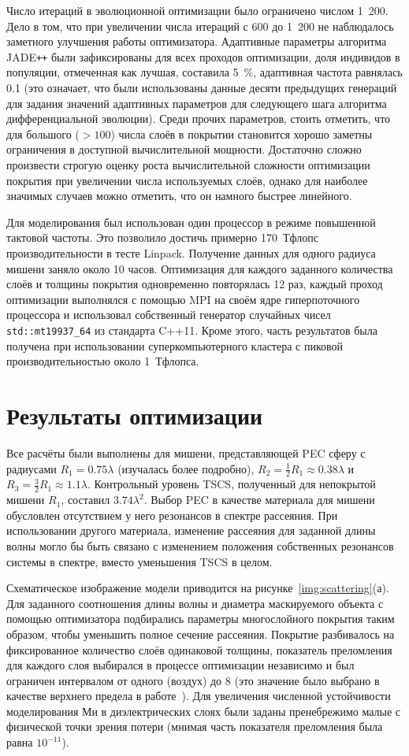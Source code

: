 Число итераций в эволюционной оптимизации было ограничено числом
1~200. Дело в том, что при увеличении числа итераций с 600 до 1~200 не
наблюдалось заметного улучшения работы оптимизатора. Адаптивные
параметры алгоритма JADE\texttt{++} были зафиксированы для всех проходов
оптимизации, доля индивидов в популяции, отмеченная как лучшая,
составила 5~\%, адаптивная частота равнялась 0.1 (это означает, что
были использованы данные десяти предыдущих генераций для задания
значений адаптивных параметров для следующего шага алгоритма
дифференциальной эволюции).  Среди прочих параметров, стоить отметить,
что для большого ($>100$) числа слоёв в покрытии становится хорошо
заметны ограничения в доступной вычислительной мощности. Достаточно
сложно произвести строгую оценку роста вычислительной сложности
оптимизации покрытия при увеличении числа используемых слоёв, однако
для наиболее значимых случаев можно отметить, что он намного быстрее
линейного.

Для моделирования был использован один процессор в режиме повышенной
тактовой частоты. Это позволило достичь примерно 170~Тфлопс
производительности в тесте Linpack. Получение данных для одного
радиуса мишени заняло около 10 часов. Оптимизация для каждого
заданного количества слоёв и толщины покрытия одновременно повторялась
12 раз, каждый проход оптимизации выполнялся с помощью MPI на своём
ядре гиперпоточного процессора и использовал собственный генератор
случайных чисел \verb+std::mt19937_64+ из стандарта C++11. Кроме
этого, часть результатов была получена при использовании
суперкомпьютерного кластера с пиковой производительностью около
1~Тфлопса.

\section{Результаты оптимизации}  
Все расчёты были выполнены для мишени, представляющей PEC сферу с
радиусами ${R_1 = 0.75\lambda}$ (изучалась более подробно),
${R_2 = \frac{1}{2}R_1\approx 0.38\lambda}$ и
${R_3 = \frac{3}{2}R_1 \approx 1.1\lambda}$.  Контрольный уровень
TSCS, полученный для непокрытой мишени ${R_1}$, составил
$3.74\lambda^2$.  Выбор PEC в качестве материала для мишени обусловлен
отсутствием у него резонансов в спектре рассеяния. При использовании
другого материала, изменение рассеяния для заданной длины волны могло
бы быть связано с изменением положения собственных резонансов системы
в спектре, вместо уменьшения TSCS в целом.

Схематическое изображение модели приводится на
рисунке~\ref{img:scattering}(а). Для заданного соотношения длины волны
и диаметра маскируемого объекта с помощью оптимизатора подбирались
параметры многослойного покрытия таким образом, чтобы уменьшить полное
сечение рассеяния.  Покрытие разбивалось на фиксированное количество
слоёв одинаковой толщины, показатель преломления для каждого слоя
выбирался в процессе оптимизации независимо и был ограничен интервалом
от одного (воздух) до $8$ (это значение было выбрано в качестве
верхнего предела в работе~\cite{semouchkina2}).  Для увеличения
численной устойчивости моделирования Ми в диэлектрических слоях были
заданы пренебрежимо малые с физической точки зрения потери (мнимая
часть показателя преломления была равна $10^{-11}$).

